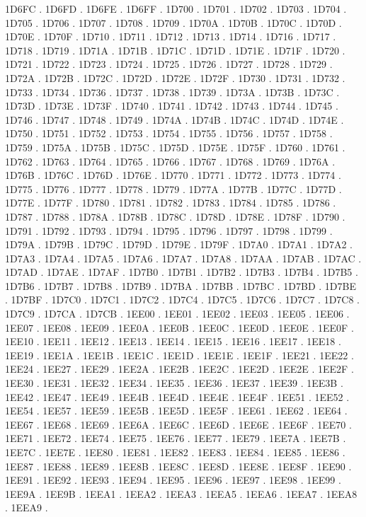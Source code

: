 1D6FC .
1D6FD .
1D6FE .
1D6FF .
1D700 .
1D701 .
1D702 .
1D703 .
1D704 .
1D705 .
1D706 .
1D707 .
1D708 .
1D709 .
1D70A .
1D70B .
1D70C .
1D70D .
1D70E .
1D70F .
1D710 .
1D711 .
1D712 .
1D713 .
1D714 .
1D716 .
1D717 .
1D718 .
1D719 .
1D71A .
1D71B .
1D71C .
1D71D .
1D71E .
1D71F .
1D720 .
1D721 .
1D722 .
1D723 .
1D724 .
1D725 .
1D726 .
1D727 .
1D728 .
1D729 .
1D72A .
1D72B .
1D72C .
1D72D .
1D72E .
1D72F .
1D730 .
1D731 .
1D732 .
1D733 .
1D734 .
1D736 .
1D737 .
1D738 .
1D739 .
1D73A .
1D73B .
1D73C .
1D73D .
1D73E .
1D73F .
1D740 .
1D741 .
1D742 .
1D743 .
1D744 .
1D745 .
1D746 .
1D747 .
1D748 .
1D749 .
1D74A .
1D74B .
1D74C .
1D74D .
1D74E .
1D750 .
1D751 .
1D752 .
1D753 .
1D754 .
1D755 .
1D756 .
1D757 .
1D758 .
1D759 .
1D75A .
1D75B .
1D75C .
1D75D .
1D75E .
1D75F .
1D760 .
1D761 .
1D762 .
1D763 .
1D764 .
1D765 .
1D766 .
1D767 .
1D768 .
1D769 .
1D76A .
1D76B .
1D76C .
1D76D .
1D76E .
1D770 .
1D771 .
1D772 .
1D773 .
1D774 .
1D775 .
1D776 .
1D777 .
1D778 .
1D779 .
1D77A .
1D77B .
1D77C .
1D77D .
1D77E .
1D77F .
1D780 .
1D781 .
1D782 .
1D783 .
1D784 .
1D785 .
1D786 .
1D787 .
1D788 .
1D78A .
1D78B .
1D78C .
1D78D .
1D78E .
1D78F .
1D790 .
1D791 .
1D792 .
1D793 .
1D794 .
1D795 .
1D796 .
1D797 .
1D798 .
1D799 .
1D79A .
1D79B .
1D79C .
1D79D .
1D79E .
1D79F .
1D7A0 .
1D7A1 .
1D7A2 .
1D7A3 .
1D7A4 .
1D7A5 .
1D7A6 .
1D7A7 .
1D7A8 .
1D7AA .
1D7AB .
1D7AC .
1D7AD .
1D7AE .
1D7AF .
1D7B0 .
1D7B1 .
1D7B2 .
1D7B3 .
1D7B4 .
1D7B5 .
1D7B6 .
1D7B7 .
1D7B8 .
1D7B9 .
1D7BA .
1D7BB .
1D7BC .
1D7BD .
1D7BE .
1D7BF .
1D7C0 .
1D7C1 .
1D7C2 .
1D7C4 .
1D7C5 .
1D7C6 .
1D7C7 .
1D7C8 .
1D7C9 .
1D7CA .
1D7CB .
1EE00 .
1EE01 .
1EE02 .
1EE03 .
1EE05 .
1EE06 .
1EE07 .
1EE08 .
1EE09 .
1EE0A .
1EE0B .
1EE0C .
1EE0D .
1EE0E .
1EE0F .
1EE10 .
1EE11 .
1EE12 .
1EE13 .
1EE14 .
1EE15 .
1EE16 .
1EE17 .
1EE18 .
1EE19 .
1EE1A .
1EE1B .
1EE1C .
1EE1D .
1EE1E .
1EE1F .
1EE21 .
1EE22 .
1EE24 .
1EE27 .
1EE29 .
1EE2A .
1EE2B .
1EE2C .
1EE2D .
1EE2E .
1EE2F .
1EE30 .
1EE31 .
1EE32 .
1EE34 .
1EE35 .
1EE36 .
1EE37 .
1EE39 .
1EE3B .
1EE42 .
1EE47 .
1EE49 .
1EE4B .
1EE4D .
1EE4E .
1EE4F .
1EE51 .
1EE52 .
1EE54 .
1EE57 .
1EE59 .
1EE5B .
1EE5D .
1EE5F .
1EE61 .
1EE62 .
1EE64 .
1EE67 .
1EE68 .
1EE69 .
1EE6A .
1EE6C .
1EE6D .
1EE6E .
1EE6F .
1EE70 .
1EE71 .
1EE72 .
1EE74 .
1EE75 .
1EE76 .
1EE77 .
1EE79 .
1EE7A .
1EE7B .
1EE7C .
1EE7E .
1EE80 .
1EE81 .
1EE82 .
1EE83 .
1EE84 .
1EE85 .
1EE86 .
1EE87 .
1EE88 .
1EE89 .
1EE8B .
1EE8C .
1EE8D .
1EE8E .
1EE8F .
1EE90 .
1EE91 .
1EE92 .
1EE93 .
1EE94 .
1EE95 .
1EE96 .
1EE97 .
1EE98 .
1EE99 .
1EE9A .
1EE9B .
1EEA1 .
1EEA2 .
1EEA3 .
1EEA5 .
1EEA6 .
1EEA7 .
1EEA8 .
1EEA9 .
